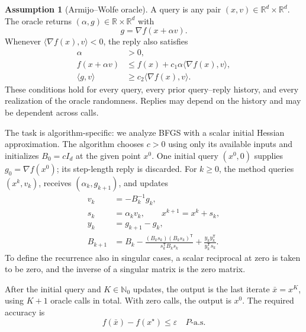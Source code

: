 \documentclass[10pt]{article}
\theoremstyle{definition}
\newtheorem{assumption}{Assumption}
\begin{document}
\begin{assumption}[Armijo--Wolfe oracle]
A query is any pair $(x,v)\in\mathbb{R}^d\times\mathbb{R}^d$. The oracle returns $(\alpha,g)\in\mathbb{R}\times\mathbb{R}^d$ with
\[
g=\nabla f(x+\alpha v).
\]
Whenever $\langle\nabla f(x),v\rangle<0$, the reply also satisfies
\[
\begin{aligned}
\alpha&>0,\\
f(x+\alpha v)&\leq f(x)+c_1\alpha\langle\nabla f(x),v\rangle,\\
\langle g,v\rangle&\geq c_2\langle\nabla f(x),v\rangle.
\end{aligned}
\]
These conditions hold for every query, every prior query--reply history, and every realization of the oracle randomness. Replies may depend on the history and may be dependent across calls.
\end{assumption}

The task is algorithm-specific: we analyze BFGS with a scalar initial Hessian approximation. The algorithm chooses $c>0$ using only its available inputs and initializes $B_0=cI_d$ at the given point $x^0$. One initial query $(x^0,0)$ supplies $g_0=\nabla f(x^0)$; its step-length reply is discarded. For $k\geq0$, the method queries $(x^k,v_k)$, receives $(\alpha_k,g_{k+1})$, and updates
\[
\begin{aligned}
v_k&=-B_k^{-1}g_k,\\
s_k&=\alpha_k v_k,\qquad x^{k+1}=x^k+s_k,\\
y_k&=g_{k+1}-g_k,\\
B_{k+1}&=B_k
-\frac{(B_ks_k)(B_ks_k)^{\mathsf T}}{s_k^{\mathsf T}B_ks_k}
+\frac{y_ky_k^{\mathsf T}}{y_k^{\mathsf T}s_k}.
\end{aligned}
\]
To define the recurrence also in singular cases, a scalar reciprocal at zero is taken to be zero, and the inverse of a singular matrix is the zero matrix.

After the initial query and $K\in\mathbb{N}_0$ updates, the output is the last iterate $\bar{x}=x^K$, using $K+1$ oracle calls in total. With zero calls, the output is $x^0$. The required accuracy is
\[
f(\bar{x})-f(x^\star)\leq\varepsilon
\quad P\text{-a.s.}
\]
\end{document}
